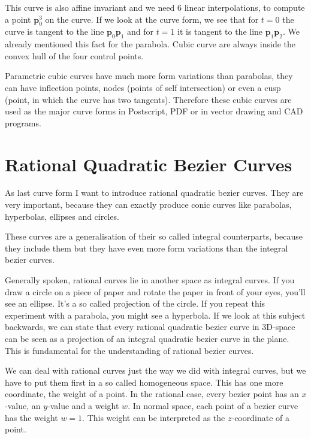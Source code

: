 \documentclass[titlepage,a4paper,11pt]{report}
\def\mb{\mathbf}
\begin{document}
This curve is also affine invariant and we need 6 linear interpolations,
to compute a point $\mb{p}_0^3$ on the curve. If we look at the curve
form, we see that for $t=0$ the curve is tangent to the line
$\mb{p}_0\mb{p}_1$ and for $t=1$ it is tangent to the line
$\mb{p}_1\mb{p}_2$. We already mentioned this fact for the parabola.
Cubic curve are always inside the convex hull of the four control points.

Parametric cubic curves have much more form variations than parabolas,
they can have inflection points, nodes (points of self intersection)
or even a cusp (point, in which the curve has two tangents). Therefore
these cubic curves are used as the major curve forms in Postscript, PDF
or in vector drawing and CAD programs.

\section{Rational Quadratic Bezier Curves}
As last curve form I want to introduce rational quadratic bezier curves.
They are very important, because they can exactly produce conic curves like
parabolas, hyperbolas, ellipses and circles.

These curves are a generalisation of their so called integral counterparts,
because they include them but they have even more form variations than
the integral bezier curves.

Generally spoken, rational curves lie in another space as integral curves.
If you draw a circle on a piece of paper and rotate the paper in front of
your eyes, you'll see an ellipse. It's a so called projection of the circle.
If you repeat this experiment with a parabola, you might see a hyperbola.
If we look at this subject backwards, we can state that every rational
quadratic bezier curve in 3D-space can be seen as a projection of an
integral quadratic bezier curve in the plane. This is fundamental for the
understanding of rational bezier curves.

We can deal with rational curves just the way we did with integral curves,
but we have to put them first in a so called homogeneous space. This has
one more coordinate, the weight of a point. In the rational case, every
bezier point has an $x$-value, an $y$-value and a weight $w$. In normal
space, each point of a bezier curve has the weight $w=1$. This weight can
be interpreted as the $z$-coordinate of a point.
\end{document}
